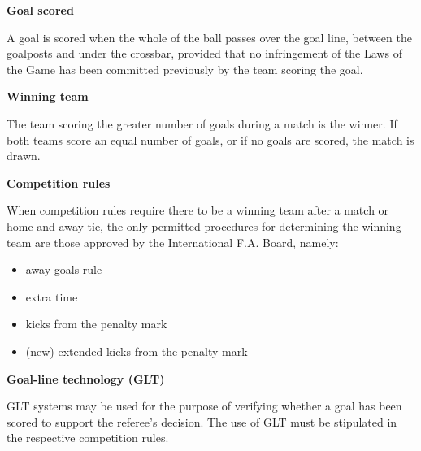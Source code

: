 \clearpage
\sffamily
{\bfseries\color[rgb]{0.4,0.4,0.4}{Law 10 -- The Method of Scoring} }
{}

\bigskip

{\bfseries Goal scored }

\headlinebox

A goal is scored when the whole of the ball passes over the goal line, between the goalposts and under the crossbar, provided that no infringement of the Laws of the Game has been committed previously by the team scoring the goal. 

\bigskip


\bigskip

{\bfseries Winning team}

\headlinebox

The team scoring the greater number of goals during a match is the winner. If both teams score an equal number of goals, or if no goals are scored, the match is drawn. 

\bigskip

{\bfseries Competition rules }

\headlinebox

When competition rules require there to be a winning team after a match or home-and-away tie, the only permitted procedures for determining the winning team are those approved by the International F.A. Board, namely:

\begin{itemize}
\item away goals rule
\item extra time
\item kicks from the penalty mark
\item (new) extended kicks from the penalty mark
\end{itemize}


{\bfseries Goal-line technology (GLT) }

\headlinebox

GLT systems may be used for the purpose of verifying whether a goal has been scored to support the referee{\textquoteright}s decision. The use of GLT must be stipulated in the respective competition rules.
